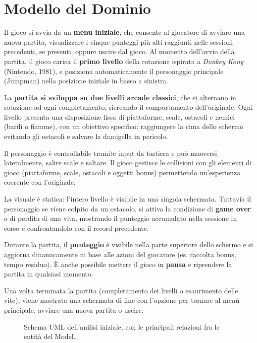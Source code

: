 \documentclass[a4paper,12pt]{report}
\begin{document}
\newpage
\section{Modello del Dominio}

Il gioco si avvia da un \textbf{menu iniziale}, che consente al giocatore di avviare una nuova partita, visualizzare i cinque punteggi più alti raggiunti nelle sessioni
precedenti, se presenti, oppure uscire dal gioco. Al momento dell'avvio della partita, il gioco carica il \textbf{primo livello} della rotazione ispirata a \textit{Donkey Kong} (Nintendo, 1981), e
posiziona automaticamente il personaggio principale (Jumpman) nella posizione iniziale in basso a sinistra.

La \textbf{partita si sviluppa su due livelli arcade classici}, che si alternano in rotazione ad ogni completamento, ricreando il comportamento dell'originale. Ogni livello
presenta una disposizione fissa di piattaforme, scale, ostacoli e nemici (barili o fiamme), con un obiettivo specifico: raggiungere la cima dello schermo evitando gli ostacoli e
salvare la damigella in pericolo.

Il personaggio è controllabile tramite input da tastiera e può muoversi lateralmente, salire scale e saltare. Il gioco gestisce le collisioni con gli elementi di
gioco (piattaforme, scale, ostacoli e oggetti bonus) permettendo un'esperienza coerente con l'originale.

La visuale è statica: l'intero livello è visibile in una singola schermata. Tuttavia il personaggio se viene colpito da un ostacolo, si attiva la condizione
di \textbf{game over} o di perdita di una vita, mostrando il punteggio accumulato nella sessione in corso e confrontandolo con il record precedente.

Durante la partita, il \textbf{punteggio} è visibile nella parte superiore dello schermo e si aggiorna dinamicamente in base alle azioni
del giocatore (es. raccolta bonus, tempo residuo). È anche possibile mettere il gioco in \textbf{pausa} e riprendere la partita in qualsiasi momento.

Una volta terminata la partita (completamento dei livelli o esaurimento delle vite), viene mostrata una schermata di fine con l'opzione per
tornare al menù principale, avviare una nuova partita o uscire.

\begin{figure}[H]
	\centering{}
	
	\caption{Schema UML dell'anilisi iniziale, con le principali relazioni fra le entità del Model.}
	\label{img:model}
\end{figure}
\end{document}
